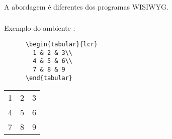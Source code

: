 \begin{frame}[standout]
  \Huge
\end{frame}

\begin{frame}[fragile]
  \frametitle{}
  \Huge
  A abordagem é diferentes dos programas WISIWYG.
\end{frame}

\begin{frame}[fragile]
  \frametitle{}
  \Large
  Exemplo do ambiente :
  \vspace{1em}

  \begin{minipage}{.65\textwidth}
    \begin{verbatim}
      \begin{tabular}{lcr}
        1 & 2 & 3\\
        4 & 5 & 6\\
        7 & 8 & 9
      \end{tabular}
    \end{verbatim}
  \end{minipage}
  \hspace{.05\textwidth}
  \begin{minipage}{.25\textwidth}
    \begin{tabular}{lcr}
      1 & 2 & 3\\
      4 & 5 & 6\\
      7 & 8 & 9
    \end{tabular}
  \end{minipage}
\end{frame}

